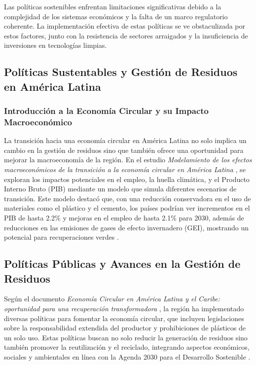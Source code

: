 \documentclass[main.tex]{subfiles}
\begin{document}
Las políticas sostenibles enfrentan limitaciones significativas debido a la complejidad de los sistemas económicos y la falta de un marco regulatorio coherente. La implementación efectiva de estas políticas se ve obstaculizada por estos factores, junto con la resistencia de sectores arraigados y la insuficiencia de inversiones en tecnologías limpias.

\subsection{Políticas Sustentables y Gestión de Residuos en América Latina}

\subsubsection{Introducción a la Economía Circular y su Impacto Macroeconómico}
La transición hacia una economía circular en América Latina no solo implica un cambio en la gestión de residuos sino que también ofrece una oportunidad para mejorar la macroeconomía de la región. En el estudio \textit{Modelamiento de los efectos macroeconómicos de la transición a la economía circular en América Latina} \cite{rodriguez2023modelamiento}, se exploran los impactos potenciales en el empleo, la huella climática, y el Producto Interno Bruto (PIB) mediante un modelo que simula diferentes escenarios de transición. Este modelo destacó que, con una reducción conservadora en el uso de materiales como el plástico y el cemento, los países podrían ver incrementos en el PIB de hasta 2.2\% y mejoras en el empleo de hasta 2.1\% para 2030, además de reducciones en las emisiones de gases de efecto invernadero (GEI), mostrando un potencial para recuperaciones verdes \cite{rodriguez2023modelamiento}.

\subsection{Políticas Públicas y Avances en la Gestión de Residuos}
Según el documento \textit{Economía Circular en América Latina y el Caribe: oportunidad para una recuperación transformadora} \cite{cepal2021economia}, la región ha implementado diversas políticas para fomentar la economía circular, que incluyen legislaciones sobre la responsabilidad extendida del productor y prohibiciones de plásticos de un solo uso. Estas políticas buscan no solo reducir la generación de residuos sino también promover la reutilización y el reciclado, integrando aspectos económicos, sociales y ambientales en línea con la Agenda 2030 para el Desarrollo Sostenible \cite{cepal2021economia}.
\end{document}
